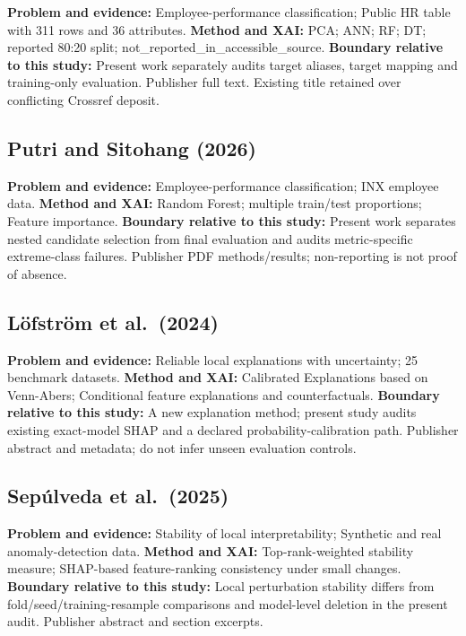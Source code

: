 \documentclass[
  a4paper,
  review]{elsarticle}
\begin{document}
\textbf{Problem and evidence:} Employee-performance classification;
Public HR table with 311 rows and 36 attributes. \textbf{Method and
XAI:} PCA; ANN; RF; DT; reported 80:20 split;
not\_reported\_in\_accessible\_source. \textbf{Boundary relative to this
study:} Present work separately audits target aliases, target mapping
and training-only evaluation. Publisher full text. Existing title
retained over conflicting Crossref deposit.

\subsection{Putri and Sitohang (2026)}\label{putri-and-sitohang-2026}

\textbf{Problem and evidence:} Employee-performance classification; INX
employee data. \textbf{Method and XAI:} Random Forest; multiple
train/test proportions; Feature importance. \textbf{Boundary relative to
this study:} Present work separates nested candidate selection from
final evaluation and audits metric-specific extreme-class failures.
Publisher PDF methods/results; non-reporting is not proof of absence.

\subsection{Löfström et al.~(2024)}\label{luxf6fstruxf6m-et-al.-2024}

\textbf{Problem and evidence:} Reliable local explanations with
uncertainty; 25 benchmark datasets. \textbf{Method and XAI:} Calibrated
Explanations based on Venn-Abers; Conditional feature explanations and
counterfactuals. \textbf{Boundary relative to this study:} A new
explanation method; present study audits existing exact-model SHAP and a
declared probability-calibration path. Publisher abstract and metadata;
do not infer unseen evaluation controls.

\subsection{Sepúlveda et al.~(2025)}\label{sepuxfalveda-et-al.-2025}

\textbf{Problem and evidence:} Stability of local interpretability;
Synthetic and real anomaly-detection data. \textbf{Method and XAI:}
Top-rank-weighted stability measure; SHAP-based feature-ranking
consistency under small changes. \textbf{Boundary relative to this
study:} Local perturbation stability differs from
fold/seed/training-resample comparisons and model-level deletion in the
present audit. Publisher abstract and section excerpts.
\end{document}
